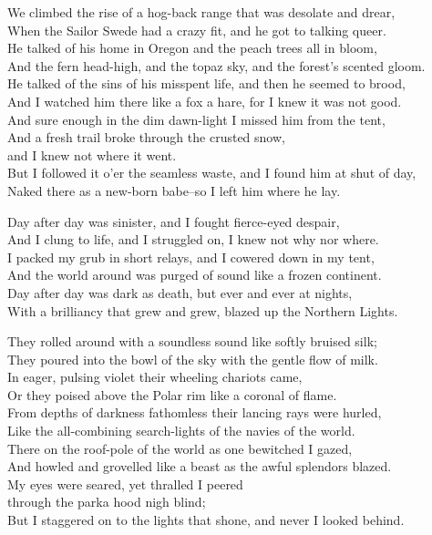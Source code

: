\begin{poemblock}
We climbed the rise of a hog-back range that was desolate and drear,\\
When the Sailor Swede had a crazy fit, and he got to talking queer.\\
He talked of his home in Oregon and the peach trees all in bloom,\\
And the fern head-high, and the topaz sky, and the forest's scented gloom.\\
He talked of the sins of his misspent life, and then he seemed to brood,\\
And I watched him there like a fox a hare, for I knew it was not good.\\
And sure enough in the dim dawn-light I missed him from the tent,\\
And a fresh trail broke through the crusted snow,\\
\idt and I knew not where it went.\\
But I followed it o'er the seamless waste, and I found him at shut of day,\\
Naked there as a new-born babe--so I left him where he lay.

Day after day was sinister, and I fought fierce-eyed despair,\\
And I clung to life, and I struggled on, I knew not why nor where.\\
I packed my grub in short relays, and I cowered down in my tent,\\
And the world around was purged of sound like a frozen continent.\\
Day after day was dark as death, but ever and ever at nights,\\
With a brilliancy that grew and grew, blazed up the Northern Lights.

They rolled around with a soundless sound like softly bruised silk;\\
They poured into the bowl of the sky with the gentle flow of milk.\\
In eager, pulsing violet their wheeling chariots came,\\
Or they poised above the Polar rim like a coronal of flame.\\
From depths of darkness fathomless their lancing rays were hurled,\\
Like the all-combining search-lights of the navies of the world.\\
There on the roof-pole of the world as one bewitched I gazed,\\
And howled and grovelled like a beast as the awful splendors blazed.\\
My eyes were seared, yet thralled I peered\\
\idt through the parka hood nigh blind;\\
But I staggered on to the lights that shone, and never I looked behind.


\end{poemblock}
